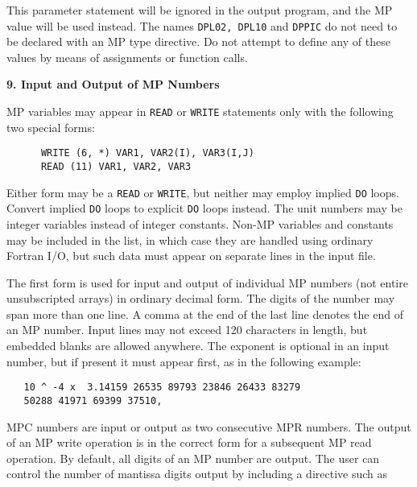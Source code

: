 \noindent
This parameter statement will be ignored in the output program, and
the MP value will be used instead.  The names {\tt DPL02, DPL10} and
{\tt DPPIC} do not need to be declared with an MP type directive.  Do
not attempt to define any of these values by means of assignments or
function calls.
 
\vspace{2ex} \noindent
{\bf 9. Input and Output of MP Numbers}
 
MP variables may appear in {\tt READ} or {\tt WRITE} statements only
with the following two special forms:
 
\begin{tt} \begin{small} \begin{verbatim}
      WRITE (6, *) VAR1, VAR2(I), VAR3(I,J)
      READ (11) VAR1, VAR2, VAR3
\end{verbatim} \end{small} \end{tt}
 
\noindent
Either form may be a {\tt READ} or {\tt WRITE}, but neither may employ
implied {\tt DO} loops.  Convert implied {\tt DO} loops to explicit
{\tt DO} loops instead.  The unit numbers may be integer variables
instead of integer constants.  Non-MP variables and constants may be
included in the list, in which case they are handled using ordinary
Fortran I/O, but such data must appear on separate lines in the input
file.
 
The first form is used for input and output of individual MP numbers
(not entire unsubscripted arrays) in ordinary decimal form.  The
digits of the number may span more than one line.  A comma at the end
of the last line denotes the end of an MP number.  Input lines may not
exceed 120 characters in length, but embedded blanks are allowed
anywhere.  The exponent is optional in an input number, but if present
it must appear first, as in the following example:
 
\begin{tt} \begin{small} \begin{verbatim}
   10 ^ -4 x  3.14159 26535 89793 23846 26433 83279
   50288 41971 69399 37510,
\end{verbatim} \end{small} \end{tt}
 
\noindent
MPC numbers are input or output as two consecutive MPR numbers.  The
output of an MP write operation is in the correct form for a
subsequent MP read operation.  By default, all digits of an MP number
are output.  The user can control the number of mantissa digits output
by including a directive such as
 
